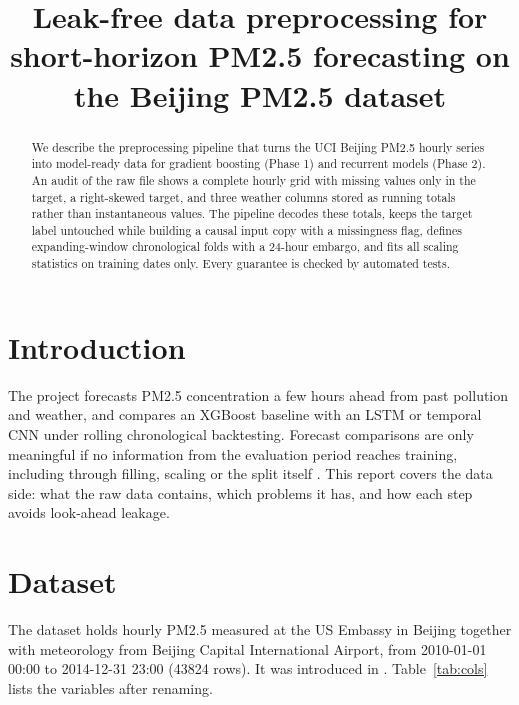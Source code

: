 \documentclass[conference]{IEEEtran}
\begin{document}
\title{Leak-free data preprocessing for short-horizon PM2.5 forecasting on the Beijing PM2.5 dataset}

\author{
}

\maketitle

\begin{abstract}
We describe the preprocessing pipeline that turns the UCI Beijing PM2.5 hourly series into model-ready data for gradient boosting (Phase 1) and recurrent models (Phase 2). An audit of the raw file shows a complete hourly grid with missing values only in the target, a right-skewed target, and three weather columns stored as running totals rather than instantaneous values. The pipeline decodes these totals, keeps the target label untouched while building a causal input copy with a missingness flag, defines expanding-window chronological folds with a 24-hour embargo, and fits all scaling statistics on training dates only. Every guarantee is checked by automated tests.
\end{abstract}

\section{Introduction}
The project forecasts PM2.5 concentration a few hours ahead from past pollution and weather, and compares an XGBoost baseline with an LSTM or temporal CNN under rolling chronological backtesting. Forecast comparisons are only meaningful if no information from the evaluation period reaches training, including through filling, scaling or the split itself \cite{tashman2000,bergmeir2012}. This report covers the data side: what the raw data contains, which problems it has, and how each step avoids look-ahead leakage.

\section{Dataset}
The dataset \cite{uci} holds hourly PM2.5 measured at the US Embassy in Beijing together with meteorology from Beijing Capital International Airport, from 2010-01-01 00:00 to 2014-12-31 23:00 (\num{43824} rows). It was introduced in \cite{liang2015}. Table~\ref{tab:cols} lists the variables after renaming.
\end{document}
